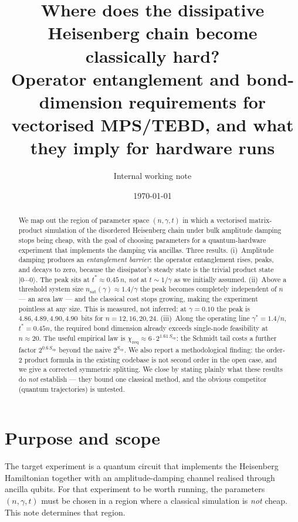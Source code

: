 \documentclass[11pt,a4paper]{article}
\title{\bfseries Where does the dissipative Heisenberg chain become\\
classically hard?\\[4pt]
\large Operator entanglement and bond-dimension requirements for\\
vectorised MPS/TEBD, and what they imply for hardware runs}
\author{Internal working note}
\date{\today}
\newcommand{\Sop}{S_{\mathrm{op}}}
\newcommand{\chreq}{\chi_{\mathrm{req}}}
\newcommand{\nsat}{n_{\mathrm{sat}}}
\begin{document}
\maketitle

\begin{abstract}
\noindent
We map out the region of parameter space $(n,\gamma,t)$ in which a vectorised
matrix-product simulation of the disordered Heisenberg chain under bulk
amplitude damping stops being cheap, with the goal of choosing parameters for a
quantum-hardware experiment that implements the damping via ancillas. Three
results. (i)~Amplitude damping produces an \emph{entanglement barrier}: the
operator entanglement rises, peaks, and decays to zero, because the dissipator's
steady state is the trivial product state $|0\cdots0\rangle$. The peak sits at
$t^\ast\!\approx\!0.45\,n$, \emph{not} at $t\!\sim\!1/\gamma$ as we initially
assumed. (ii)~Above a threshold system size $\nsat(\gamma)\approx1.4/\gamma$ the
peak becomes completely independent of $n$ --- an area law --- and the classical
cost stops growing, making the experiment pointless at any size. This is
measured, not inferred: at $\gamma=0.10$ the peak is $4.86,4.89,4.90,4.90$~bits
for $n=12,16,20,24$. (iii)~Along the operating line $\gamma^\ast=1.4/n$,
$t^\ast=0.45n$, the required bond dimension already exceeds single-node
feasibility at $n\approx20$. The useful empirical law is
$\chreq \approx 6\cdot 2^{1.61\,\Sop}$: the Schmidt tail costs a further
factor $2^{0.6\,\Sop}$ beyond the naive $2^{\Sop}$.
We also report a methodological finding: the order-2 product formula in the
existing codebase is not second order in the open case, and we give a corrected
symmetric splitting. We close by stating plainly what these results do
\emph{not} establish --- they bound one classical method, and the obvious
competitor (quantum trajectories) is untested.
\end{abstract}

\tableofcontents
\vspace{4mm}

\section{Purpose and scope}

The target experiment is a quantum circuit that implements the Heisenberg
Hamiltonian together with an amplitude-damping channel realised through ancilla
qubits. For that experiment to be worth running, the parameters
$(n,\gamma,t)$ must be chosen in a region where a classical simulation is
\emph{not} cheap. This note determines that region.
\end{document}
